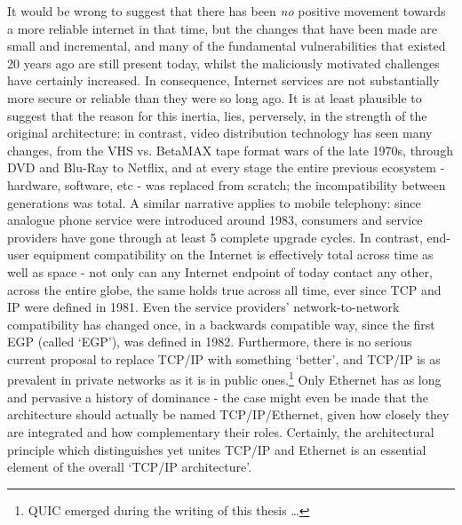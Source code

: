 It would be wrong to suggest that there has been \emph{no} positive movement towards a more reliable internet in that time, but the changes that have been made are small and incremental, and many of the fundamental vulnerabilities that existed 20 years ago are still present today, whilst the maliciously motivated challenges have certainly increased.
In consequence, Internet services are not substantially more secure or reliable than they were so long ago.
It is at least plausible to suggest that the reason for this inertia, lies, perversely, in the strength of the original architecture: in contrast, video distribution technology has seen many changes, from the VHS vs. BetaMAX tape format wars of the late 1970s, through DVD and Blu-Ray to Netflix, and at every stage the entire previous ecosystem - hardware, software, etc - was replaced from scratch; the incompatibility between generations was total.
A similar narrative applies to mobile telephony: since analogue phone service were introduced around 1983, consumers and service providers have gone through at least 5 complete upgrade cycles.
In contrast, end-user equipment compatibility on the Internet is effectively total across time as well as space - not only can any Internet endpoint of today contact any other, across the entire globe, the same holds true across all time, ever since TCP and IP were defined in 1981.
Even the service providers' network-to-network compatibility has changed once, in a backwards compatible way, since the first EGP (called `EGP'), was defined in 1982.
Furthermore, there is no serious current proposal to replace TCP/IP with something `better', and TCP/IP is as prevalent in private networks as it is in public ones.\footnote{QUIC emerged during the writing of this thesis \ldots}
Only Ethernet has as long and pervasive a history of dominance - the case might even be made that the architecture should actually be named TCP/IP/Ethernet, given how closely they are integrated and how complementary their roles.
Certainly, the architectural principle which distinguishes yet unites TCP/IP and Ethernet is an essential element of the overall `TCP/IP architecture'.
\medskip

